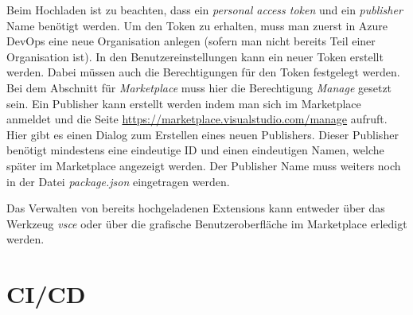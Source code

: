 Beim Hochladen ist zu beachten, dass ein \emph{personal access token}
und ein \emph{publisher} Name benötigt werden.
Um den Token zu erhalten, muss man zuerst in Azure DevOps eine neue Organisation
anlegen (sofern man nicht bereits Teil einer Organisation ist). In den 
Benutzereinstellungen kann ein neuer Token erstellt werden. Dabei müssen auch die 
Berechtigungen für den Token festgelegt werden. Bei dem Abschnitt für 
\emph{Marketplace} muss hier die Berechtigung \emph{Manage} gesetzt sein.
Ein Publisher kann erstellt werden indem man sich im Marketplace anmeldet
und die Seite \url{https://marketplace.visualstudio.com/manage} aufruft.
Hier gibt es einen Dialog zum Erstellen eines neuen Publishers. Dieser
Publisher benötigt mindestens eine eindeutige ID und einen eindeutigen
Namen, welche später im Marketplace angezeigt werden. Der Publisher Name
muss weiters noch in der Datei \emph{package.json} eingetragen werden.

Das Verwalten von bereits hochgeladenen Extensions kann entweder
über das Werkzeug \emph{vsce} oder über die grafische Benutzeroberfläche
im Marketplace erledigt werden.

\section{CI/CD}
\label{sec:EntwicklungVsCode_CICD}